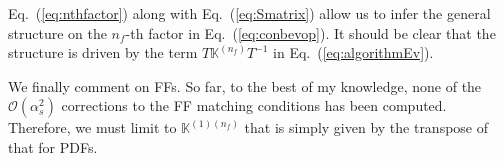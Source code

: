 \documentclass[10pt,a4paper]{article}
\begin{document}
Eq.~(\ref{eq:nthfactor}) along with Eq.~(\ref{eq:Smatrix}) allow us to
infer the general structure on the $n_f$-th factor in
Eq.~(\ref{eq:conbevop}). It should be clear that the structure is
driven by the term $T\mathbb{K}^{(n_f)}T^{-1}$ in
Eq.~(\ref{eq:algorithmEv}).

We finally comment on FFs. So far, to the best of my knowledge, none
of the $\mathcal{O}(\alpha_s^2)$ corrections to the FF matching
conditions has been computed. Therefore, we must limit to
$\mathbb{K}^{(1)(n_f)}$ that is simply given by the transpose of that
for PDFs.

\newpage


\end{document}
